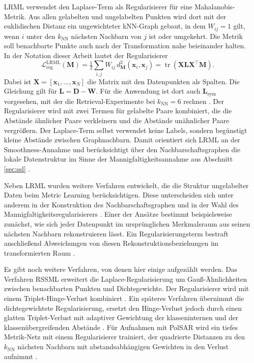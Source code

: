 \ac{LRML} verwendet den Laplace-Term als Regularisierer für eine Mahalanobis-Metrik. Aus allen gelabelten und ungelabelten Punkten wird dort mit der euklidischen Distanz ein ungewichteter \ac{kNN}-Graph gebaut, in dem $W_{ij}=1$ gilt, wenn $i$ unter den $k_{\mathrm{NN}}$ nächsten Nachbarn von $j$ ist oder umgekehrt. Die Metrik soll benachbarte Punkte auch nach der Transformation nahe beieinander halten. In der Notation dieser Arbeit lautet der Regularisierer \cite{bellet_survey_2014, hoi_semi-supervised_2010}
\begin{equation}
  \mathcal{L}_{\mathrm{reg}}^{\mathrm{LRML}}(\bm{M})=\tfrac{1}{2}\sum_{i,j}W_{ij}\,d_{\bm{M}}^{2}(\bm{x}_i,\bm{x}_j)=\operatorname{tr}(\bm{X}\bm{L}\bm{X}^{\top}\bm{M}).
  \label{eq:lrml}
\end{equation}
Dabei ist $\bm{X}=[\bm{x}_1,\dots,\bm{x}_N]$ die Matrix mit den Datenpunkten als Spalten. Die Gleichung gilt für $\bm{L}=\bm{D}-\bm{W}$. Für die Anwendung ist dort auch $\bm{L}_{\mathrm{sym}}$ vorgesehen, mit der die Retrieval-Experimente bei $k_{\mathrm{NN}}=6$ rechnen \cite{hoi_semi-supervised_2010}. Der Regularisierer wird mit zwei Termen für gelabelte Paare kombiniert, die die Abstände ähnlicher Paare verkleinern und die Abstände unähnlicher Paare vergrößern. Der Laplace-Term selbst verwendet keine Labels, sondern begünstigt kleine Abstände zwischen Graphnachbarn. Damit orientiert sich \ac{LRML} an der Smoothness-Annahme und berücksichtigt über den Nachbarschaftsgraphen die lokale Datenstruktur im Sinne der Mannigfaltigkeitsannahme aus Abschnitt \ref{sec:ssl} \cite{bellet_survey_2014, hoi_semi-supervised_2010}.

Neben \ac{LRML} wurden weitere Verfahren entwickelt, die die Struktur ungelabelter Daten beim Metric Learning berücksichtigen. Diese unterscheiden sich unter anderem in der Konstruktion des Nachbarschaftsgraphen und in der Wahl des Mannigfaltigkeitsregularisierers \cite{bellet_survey_2014}. Einer der Ansätze bestimmt beispielsweise zunächst, wie sich jeder Datenpunkt
im ursprünglichen Merkmalsraum aus seinen nächsten Nachbarn
rekonstruieren lässt. Ein Regularisierungsterm bestraft
anschließend Abweichungen von diesen Rekonstruktionsbeziehungen
im transformierten Raum \cite{baghshah_semi-supervised_2009}.

Es gibt noch weitere Verfahren, von denen hier einige aufgezählt werden. Das Verfahren \ac{RSSML} erweitert die Laplace-Regularisierung um Gauß-Ähnlichkeiten zwischen benachbarten Punkten und Dichtegewichte. Der Regularisierer wird mit einem Triplet-Hinge-Verlust kombiniert \cite{wang_semi-supervised_2012}. Ein späteres Verfahren übernimmt die dichtegewichtete Regularisierung, ersetzt den Hinge-Verlust jedoch durch einen glatten Triplet-Verlust mit adaptiver Gewichtung der klasseninternen und der klassenübergreifenden Abstände \cite{ying_manifold_2018}. Für Aufnahmen mit \ac{PolSAR} wird ein tiefes Metrik-Netz mit einem Regularisierer trainiert, der quadrierte Distanzen zu den $k_{\mathrm{NN}}$ nächsten Nachbarn mit abstandsabhängigen Gewichten in den Verlust aufnimmt \cite{liu_semi-supervised_2020}.

